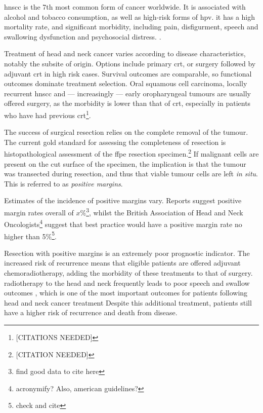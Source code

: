 
\Gls{hnscc} is the 7th most common form of cancer worldwide. 
It is associated with alcohol and tobacco consumption, as well as high-risk forms of \gls{hpv}.
it has a high mortality rate, and significant morbidity, including pain, disfigurment, speech and swallowing dysfunction and psychosocial distress. \cite{chowHeadNeckCancer2020}.

Treatment of head and neck cancer varies according to disease characteristics, notably the subsite of origin.
Options include primary \gls{crt}, or surgery followed by adjuvant \gls{crt} in high risk cases.
Survival outcomes are comparable, so functional outcomes dominate treatment selection.
Oral squamous cell carcinoma, locally recurrent \gls{hnscc} and --- increasingly --- early oropharyngeal tumours are usually offered surgery, as the morbidity is lower than that of \gls{crt}, especially in patients who have had previous \gls{crt}\footnote{[CITATIONS NEEDED]}.

The success of surgical resection relies on the complete removal of the tumour.
The current gold standard for assessing the completeness of resection is histopathological assessment of the \gls{ffpe} resection specimen.\footnote{[CITATION NEEDED]}
If malignant cells are present on the cut surface of the specimen, the implication is that the tumour was transected during resection, and thus that viable tumour cells are left \textit{in situ}.
This is referred to as \emph{positive margins}.

Estimates of the incidence of positive margins vary.
Reports suggest positive margin rates overall of $x$\%\footnote{find good data to cite here}, whilst the British Association of Head and Neck Oncologists\footnote{acronymify? Also, american guidelines?} suggest that best practice would have a positive margin rate no higher than 5\%\footnote{check and cite}.

Resection with positive margins is an extremely poor prognostic indicator.
The increased risk of recurrence means that eligible patients are offered adjuvant chemoradiotherapy, adding the morbidity of these treatments to that of surgery.
radiotherapy to the head and neck frequently leads to poor speech and swallow outcomes \cite{machtayFactorsAssociatedSevere2008, wangPharyngoesophagealStrictureTreatment2012}, which is one of the most important outcomes for patients following head and neck cancer treatment \cite{wilsonDysphagiaNonsurgicalHead2011} 
Despite this additional treatment, patients still have a higher risk of recurrence and death from disease.

